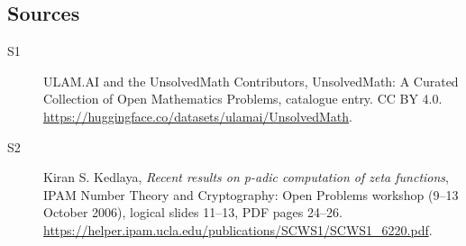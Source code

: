 \documentclass[11pt]{article}
\begin{document}
\subsection{Sources}
\begin{description}
\item[\hypertarget{source:statement:1}{S1}] ULAM.AI and the UnsolvedMath Contributors, UnsolvedMath: A Curated Collection of Open Mathematics Problems, catalogue entry. CC BY 4.0. \url{https://huggingface.co/datasets/ulamai/UnsolvedMath}.
\item[\hypertarget{source:statement:2}{S2}] Kiran S. Kedlaya, \emph{Recent results on p-adic computation of zeta functions}, IPAM Number Theory and Cryptography: Open Problems workshop (9--13 October 2006), logical slides 11--13, PDF pages 24--26. \url{https://helper.ipam.ucla.edu/publications/SCWS1/SCWS1_6220.pdf}.
\end{description}
\label{end:statement}
\end{document}
